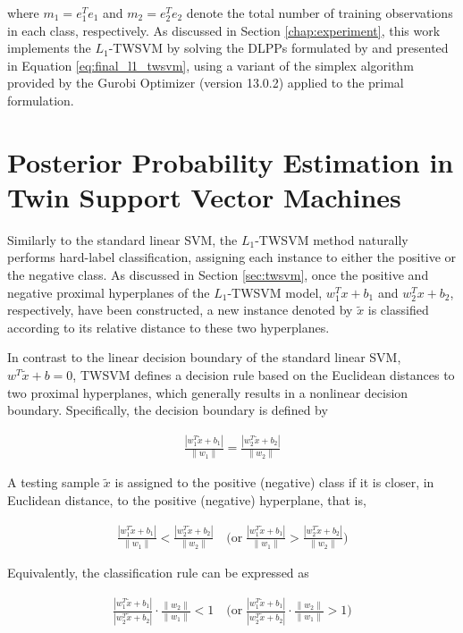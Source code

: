 \documentclass[12pt]{report} %
\begin{document}
where $m_1 = e_1^Te_1$ and $m_2 = e_2^Te_2$ denote the total number of training observations in each class, respectively. As discussed in Section \ref{chap:experiment}, this work implements the $L_1$-TWSVM by solving the DLPPs formulated by \cite{bai2014novel} and presented in Equation \ref{eq:final_l1_twsvm}, using a variant of the simplex algorithm provided by the Gurobi Optimizer (version 13.0.2) applied to the primal formulation.


\section{Posterior Probability Estimation in Twin Support Vector Machines} \label{sec:ptwsvm}

Similarly to the standard linear SVM, the $L_1$-TWSVM method naturally performs hard-label classification, assigning each instance to either the positive or the negative class. As discussed in Section \ref{sec:twsvm}, once the positive and negative proximal hyperplanes of the $L_1$-TWSVM model, $w_1^Tx+b_1$ and $w_2^Tx+b_2$, respectively, have been constructed, a new instance denoted by $\tilde{x}$ is classified according to its relative distance to these two hyperplanes.

In contrast to the linear decision boundary of the standard linear SVM, $w^T\tilde{x} +b = 0$, TWSVM defines a decision rule based on the Euclidean distances to two proximal hyperplanes, which generally results in a nonlinear decision boundary. Specifically, the decision boundary is defined by

\begin{align}
\frac{|w_1^T\tilde{x} + b_1|}{\|w_1\|} = \frac{|w_2^T\tilde{x} + b_2|}{\|w_2\|}
\end{align}

A testing sample $\tilde{x}$ is assigned to the positive (negative) class if it is closer, in Euclidean distance, to the positive (negative) hyperplane, that is,

\begin{align}
\frac{|w_1^T\tilde{x} + b_1|}{\|w_1\|} < \frac{|w_2^T\tilde{x} + b_2|}{\|w_2\|} \quad \Big(\text{or}\; \frac{|w_1^T\tilde{x} + b_1|}{\|w_1\|} > \frac{|w_2^T\tilde{x} + b_2|}{\|w_2\|}\Big)
\end{align}

Equivalently, the classification rule can be expressed as

\begin{align}
\label{eq:twsvm_decision_rule}
\frac{|w_1^T\tilde{x}+b_1|}{|w_2^T\tilde{x} + b_2|} \cdot \frac{\|w_2\|}{\|w_1\|} < 1 \quad \Big(\text{or}\; \frac{|w_1^T\tilde{x}+b_1|}{|w_2^T\tilde{x} + b_2|} \cdot \frac{\|w_2\|}{\|w_1\|} > 1 \Big)
\end{align}
\end{document}
